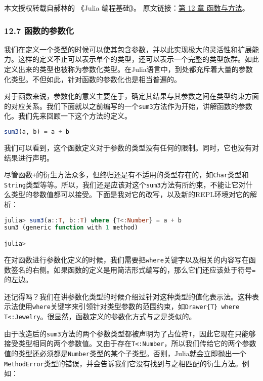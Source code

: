 
本文授权转载自郝林的 《Julia 编程基础》。 原文链接：\href{https://github.com/hyper0x/JuliaBasics/blob/master/book/ch12.md}{第 12 章 函数与方法}。


\subsubsection{12.7 函数的参数化}

我们在定义一个类型的时候可以使其包含参数，并以此实现极大的灵活性和扩展能力。这样的定义不止可以表示单个的类型，还可以表示一个完整的类型族群。如此定义出来的类型也被称为参数化类型。在Julia语言中，到处都充斥着大量的参数化类型。不但如此，针对函数的参数化也是相当普遍的。

对于函数来说，参数化的意义主要在于，确定其结果与其参数之间在类型约束方面的对应关系。我们下面就以之前编写的一个\verb`sum3`方法作为开始，讲解函数的参数化。我们先来回顾一下这个方法的定义。

\begin{lstlisting}[language=julia]
sum3(a, b) = a + b
\end{lstlisting}

我们可以看到，这个函数定义对于参数的类型没有任何的限制。同时，它也没有对结果进行声明。

尽管函数\verb`+`的衍生方法众多，但终归还是有不适用的类型存在的，如\verb`Char`类型和\verb`String`类型等等。所以，我们还是应该对这个\verb`sum3`方法有所约束，不能让它对什么类型的参数值都可以接受。下面是我对它的改写，以及新的REPL环境对它的解析：

\begin{lstlisting}[language=julia]
julia> sum3(a::T, b::T) where {T<:Number} = a + b
sum3 (generic function with 1 method)

julia> 
\end{lstlisting}

在对函数进行参数化定义的时候，我们需要把\verb`where`关键字以及相关的内容写在函数签名的右侧。如果函数的定义是用简洁形式编写的，那么它们还应该处于符号\verb`=`的左边。

还记得吗？我们在讲参数化类型的时候介绍过针对这种类型的值化表示法。这种表示法使用\verb`where`关键字来引领针对类型参数的范围约束，如\verb`Drawer{T} where T<:Jewelry`。很显然，函数定义的参数化方式与之是类似的。

由于改造后的\verb`sum3`方法的两个参数类型都被声明为了占位符\verb`T`，因此它现在只能够接受类型相同的两个参数值。又由于存在\verb`T<:Number`，所以我们传给它的两个参数值的类型还必须都是\verb`Number`类型的某个子类型。否则，Julia就会立即抛出一个\verb`MethodError`类型的错误，并会告诉我们它没有找到与之相匹配的衍生方法。例如：

